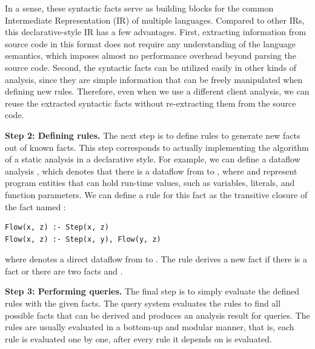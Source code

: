 In a sense, these syntactic facts serve as building blocks for the
common Intermediate Representation (IR) of multiple languages.
Compared to other IRs, this declarative-style IR has a few advantages.
First, extracting information from source code in this format does not
require any understanding of the language semantics, which imposes
almost no performance overhead beyond parsing the source code.
Second, the syntactic facts can be utilized easily in other kinds of
analysis, since they are simple information that can be freely
manipulated when defining new rules. Therefore, even when we use a different
client analysis, we can reuse the extracted syntactic facts
without re-extracting them from the source code.

\smallskip
\textbf{Step 2: Defining rules.}
The next step is to define rules to generate new facts out of known facts.
This step corresponds to actually implementing the algorithm of a static
analysis in a declarative style.  For example, we can define a dataflow
analysis ,  which denotes that there is a dataflow from 
to , where  and  represent program entities that can hold
run-time values, such as variables, literals, and function parameters.  We
can define a rule for this fact as the transitive closure of the fact named
:

\begin{lstlisting}[style=mrule]
Flow(x, z) :- Step(x, z)
Flow(x, z) :- Step(x, y), Flow(y, z)
\end{lstlisting}

\noindent
where  denotes a direct dataflow from  to . The
rule derives a new fact  if there is a fact  or
there are two facts  and .


\smallskip
\textbf{Step 3: Performing queries.}
The final step is to simply evaluate the defined rules with the given facts.
The query system evaluates the rules to find all possible facts that can be
derived and produces an analysis result for queries. The rules are usually
evaluated in a bottom-up and modular manner, that is, each rule is evaluated
one by one, after every rule it depends on is evaluated.

